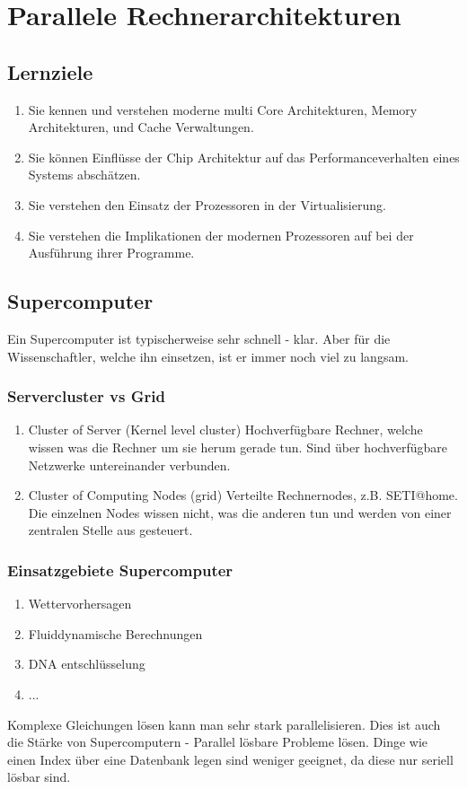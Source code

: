 \chapter{Parallele Rechnerarchitekturen}
\section{Lernziele}
\begin{enumerate}
	\item Sie kennen und verstehen moderne multi Core Architekturen, Memory Architekturen, und Cache Verwaltungen.
	\item Sie können Einflüsse der Chip Architektur auf das	Performanceverhalten eines Systems abschätzen.
	\item Sie verstehen den Einsatz der Prozessoren in der Virtualisierung.
	\item Sie verstehen die Implikationen der modernen Prozessoren auf bei der Ausführung ihrer Programme.
\end{enumerate}
\section{Supercomputer}
Ein Supercomputer ist typischerweise sehr schnell - klar. Aber für die Wissenschaftler, welche ihn einsetzen, ist er immer noch viel zu langsam.
\subsection{Servercluster vs Grid}
\begin{enumerate}
	\item Cluster of Server (Kernel level cluster)
		\subitem Hochverfügbare Rechner, welche wissen was die Rechner um sie herum gerade tun. Sind über hochverfügbare Netzwerke untereinander verbunden.
	\item Cluster of Computing Nodes (grid)
		\subitem Verteilte Rechnernodes, z.B. SETI@home. Die einzelnen Nodes wissen nicht, was die anderen tun und werden von einer zentralen Stelle aus gesteuert.
\end{enumerate}
\subsection{Einsatzgebiete Supercomputer}
\begin{enumerate}
	\item Wettervorhersagen
	\item Fluiddynamische Berechnungen
	\item DNA entschlüsselung
	\item ...
\end{enumerate}
Komplexe Gleichungen lösen kann man sehr stark parallelisieren. Dies ist auch die Stärke von Supercomputern - Parallel lösbare Probleme lösen. Dinge wie einen Index über eine Datenbank legen sind weniger geeignet, da diese nur seriell lösbar sind.
